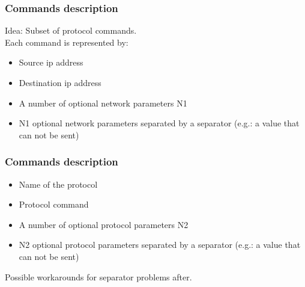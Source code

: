 \documentclass{beamer}
\begin{document}
\begin{frame}
    \frametitle{Commands description}

    Idea: Subset of protocol commands.\\
    Each command is represented by:
    \vfill
    \begin{itemize}
        \item Source ip address
            \vfill
        \item Destination ip address
            \vfill
        \item A number of optional network parameters N1
            \vfill
        \item N1 optional network parameters separated by a separator (e.g.: a value that can not be sent)
    \end{itemize}
\end{frame}

\begin{frame}
    \frametitle{Commands description}

    \begin{itemize}
        \item Name of the protocol
            \vfill
        \item Protocol command
            \vfill
        \item A number of optional protocol parameters N2
            \vfill
        \item N2 optional protocol parameters separated by a separator (e.g.: a value that can not be sent)
    \end{itemize}
    \vfill
    Possible workarounds for separator problems after.
\end{frame}
\end{document}
